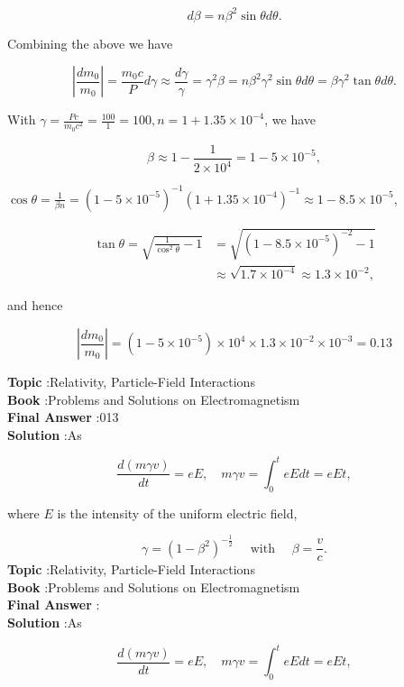 \documentclass[10pt]{article}
\begin{document}
$$
d \beta=n \beta^{2} \sin \theta d \theta .
$$

Combining the above we have

$$
\left|\frac{d m_{0}}{m_{0}}\right|=\frac{m_{0} c}{P} d \gamma \approx \frac{d \gamma}{\gamma}=\gamma^{2} \beta=n \beta^{2} \gamma^{2} \sin \theta d \theta=\beta \gamma^{2} \tan \theta d \theta .
$$

With $\gamma=\frac{P c}{m_{0} c^{2}}=\frac{100}{1}=100, n=1+1.35 \times 10^{-4}$, we have

$$
\beta \approx 1-\frac{1}{2 \times 10^{4}}=1-5 \times 10^{-5},
$$

$\cos \theta=\frac{1}{\beta n}=\left(1-5 \times 10^{-5}\right)^{-1}\left(1+1.35 \times 10^{-4}\right)^{-1} \approx 1-8.5 \times 10^{-5}$, 

$$
\begin{aligned}
\tan \theta=\sqrt{\frac{1}{\cos ^{2} \theta}-1} &=\sqrt{\left(1-8.5 \times 10^{-5}\right)^{-2}-1} \\
& \approx \sqrt{1.7 \times 10^{-4}} \approx 1.3 \times 10^{-2},
\end{aligned}
$$

and hence

$$
\left|\frac{d m_{0}}{m_{0}}\right|=\left(1-5 \times 10^{-5}\right) \times 10^{4} \times 1.3 \times 10^{-2} \times 10^{-3}=0.13
$$

\textbf{Topic} :Relativity, Particle-Field Interactions\\
\textbf{Book} :Problems and Solutions on Electromagnetism\\
\textbf{Final Answer} :013\\


\textbf{Solution} :As

$$
\frac{d(m \gamma v)}{d t}=e E, \quad m \gamma v=\int_{0}^{t} e E d t=e E t,
$$

where $E$ is the intensity of the uniform electric field,

$$
\gamma=\left(1-\beta^{2}\right)^{-\frac{1}{2}} \quad \text { with } \quad \beta=\frac{v}{c} .
$$
\textbf{Topic} :Relativity, Particle-Field Interactions\\
\textbf{Book} :Problems and Solutions on Electromagnetism\\
\textbf{Final Answer} :\\


\textbf{Solution} :As

$$
\frac{d(m \gamma v)}{d t}=e E, \quad m \gamma v=\int_{0}^{t} e E d t=e E t,
$$
\end{document}
